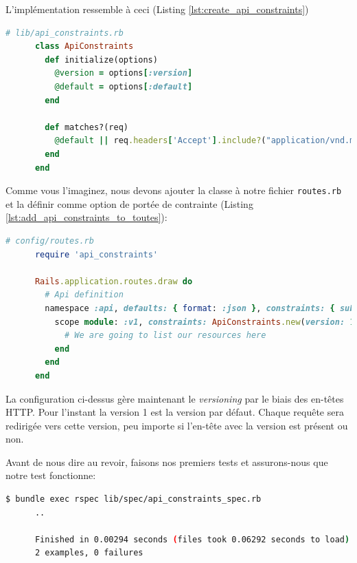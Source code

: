 \documentclass[]{report}
\begin{document}
    L'implémentation ressemble à ceci (Listing \ref{lst:create_api_constraints})

    \begin{scriptsize}
      \begin{lstlisting}[language=ruby, caption={La classe ApiConstraints}, label={lst:create_api_constraints}]
      # lib/api_constraints.rb
      class ApiConstraints
        def initialize(options)
          @version = options[:version]
          @default = options[:default]
        end

        def matches?(req)
          @default || req.headers['Accept'].include?("application/vnd.marketplace.v#{@version}")
        end
      end
      \end{lstlisting}
    \end{scriptsize}

    Comme vous l'imaginez, nous devons ajouter la classe à notre fichier \verb|routes.rb| et la définir comme option de portée de contrainte (Listing \ref{lst:add_api_constraints_to_toutes}):

    \begin{scriptsize}
      \begin{lstlisting}[language=ruby, caption={Ajout de la contrainte à la route}, label={lst:add_api_constraints_to_toutes}]
      # config/routes.rb
      require 'api_constraints'

      Rails.application.routes.draw do
        # Api definition
        namespace :api, defaults: { format: :json }, constraints: { subdomain: 'api' }, path: '/' do
          scope module: :v1, constraints: ApiConstraints.new(version: 1, default: true) do
            # We are going to list our resources here
          end
        end
      end
      \end{lstlisting}
    \end{scriptsize}

    La configuration ci-dessus gère maintenant le \textit{versioning} par le biais des en-têtes HTTP. Pour l'instant la version 1 est la version par défaut. Chaque requête sera redirigée vers cette version, peu importe si l'en-tête avec la version est présent ou non.

    Avant de nous dire au revoir, faisons nos premiers tests et assurons-nous que notre test fonctionne:

    \begin{scriptsize}
      \begin{lstlisting}[language=bash]
      $ bundle exec rspec lib/spec/api_constraints_spec.rb
      ..

      Finished in 0.00294 seconds (files took 0.06292 seconds to load)
      2 examples, 0 failures
      \end{lstlisting}
    \end{scriptsize}
\end{document}
